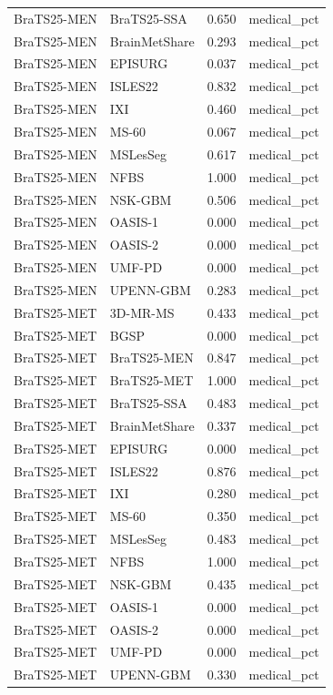 \begin{tabular}{llrl}
BraTS25-MEN & BraTS25-SSA & 0.650 & medical\_pct \\
BraTS25-MEN & BrainMetShare & 0.293 & medical\_pct \\
BraTS25-MEN & EPISURG & 0.037 & medical\_pct \\
BraTS25-MEN & ISLES22 & 0.832 & medical\_pct \\
BraTS25-MEN & IXI & 0.460 & medical\_pct \\
BraTS25-MEN & MS-60 & 0.067 & medical\_pct \\
BraTS25-MEN & MSLesSeg & 0.617 & medical\_pct \\
BraTS25-MEN & NFBS & 1.000 & medical\_pct \\
BraTS25-MEN & NSK-GBM & 0.506 & medical\_pct \\
BraTS25-MEN & OASIS-1 & 0.000 & medical\_pct \\
BraTS25-MEN & OASIS-2 & 0.000 & medical\_pct \\
BraTS25-MEN & UMF-PD & 0.000 & medical\_pct \\
BraTS25-MEN & UPENN-GBM & 0.283 & medical\_pct \\
BraTS25-MET & 3D-MR-MS & 0.433 & medical\_pct \\
BraTS25-MET & BGSP & 0.000 & medical\_pct \\
BraTS25-MET & BraTS25-MEN & 0.847 & medical\_pct \\
BraTS25-MET & BraTS25-MET & 1.000 & medical\_pct \\
BraTS25-MET & BraTS25-SSA & 0.483 & medical\_pct \\
BraTS25-MET & BrainMetShare & 0.337 & medical\_pct \\
BraTS25-MET & EPISURG & 0.000 & medical\_pct \\
BraTS25-MET & ISLES22 & 0.876 & medical\_pct \\
BraTS25-MET & IXI & 0.280 & medical\_pct \\
BraTS25-MET & MS-60 & 0.350 & medical\_pct \\
BraTS25-MET & MSLesSeg & 0.483 & medical\_pct \\
BraTS25-MET & NFBS & 1.000 & medical\_pct \\
BraTS25-MET & NSK-GBM & 0.435 & medical\_pct \\
BraTS25-MET & OASIS-1 & 0.000 & medical\_pct \\
BraTS25-MET & OASIS-2 & 0.000 & medical\_pct \\
BraTS25-MET & UMF-PD & 0.000 & medical\_pct \\
BraTS25-MET & UPENN-GBM & 0.330 & medical\_pct \\

\end{tabular}
